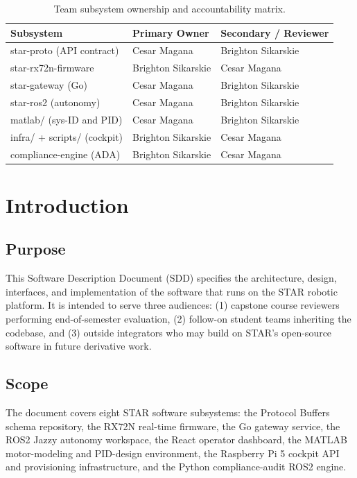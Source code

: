 \documentclass[11pt,letterpaper]{article}
\begin{document}
\begin{table}[H]
\centering
\caption{Team subsystem ownership and accountability matrix.}
\label{tab:contributions}
\small
\begin{tabularx}{\linewidth}{l l X}
\toprule
\textbf{Subsystem} & \textbf{Primary Owner} & \textbf{Secondary / Reviewer} \\
\midrule
star-proto (API contract)     & Cesar Magana       & Brighton Sikarskie \\
star-rx72n-firmware           & Brighton Sikarskie & Cesar Magana       \\
star-gateway (Go)             & Cesar Magana       & Brighton Sikarskie \\
star-ros2 (autonomy)          & Cesar Magana       & Brighton Sikarskie \\
matlab/ (sys-ID and PID)      & Cesar Magana       & Brighton Sikarskie \\
infra/ + scripts/ (cockpit)   & Brighton Sikarskie & Cesar Magana       \\
compliance-engine (ADA)       & Brighton Sikarskie & Cesar Magana       \\
\bottomrule
\end{tabularx}
\end{table}

\section{Introduction}
\label{sec:introduction}

\subsection{Purpose}
This Software Description Document (SDD) specifies the architecture,
design, interfaces, and implementation of the software that runs on the
STAR robotic platform. It is intended to serve three audiences: (1)
capstone course reviewers performing end-of-semester evaluation, (2)
follow-on student teams inheriting the codebase, and (3) outside
integrators who may build on STAR's open-source software in future
derivative work.

\subsection{Scope}
The document covers eight STAR software subsystems: the Protocol
Buffers schema repository, the RX72N real-time firmware, the Go gateway
service, the ROS2 Jazzy autonomy workspace, the React operator
dashboard, the MATLAB motor-modeling and PID-design environment, the
Raspberry Pi 5 cockpit API and provisioning infrastructure, and the
Python compliance-audit ROS2 engine.
\end{document}
